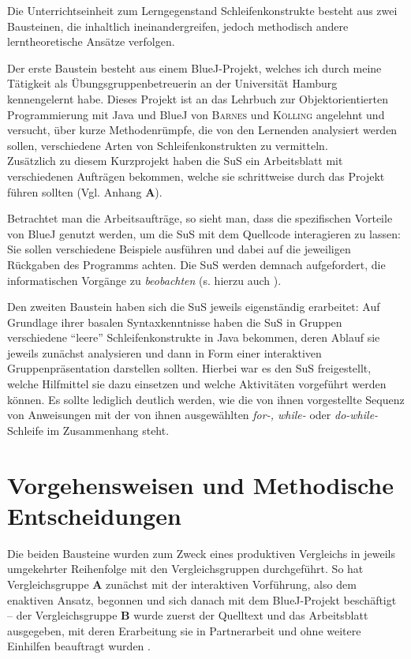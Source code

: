 \documentclass[paper=a4, DIV=13, BCOR=12mm, twoside=on, onecolumn=on, open = any, titlepage =on, parskip =half-, headsepline = on, footsepline = on, chapterprefix = on, sectionprefix = on, appendixprefix = off, fontsize = 11pt, numbers = noenddot, abstract = off]{scrreprt}
\begin{document}
Die Unterrichtseinheit zum Lerngegenstand Schleifenkonstrukte besteht aus zwei Bausteinen, die inhaltlich ineinandergreifen, jedoch methodisch andere lerntheoretische Ansätze verfolgen. 

Der erste Baustein besteht aus einem BlueJ-Projekt, welches ich durch meine Tätigkeit als Übungsgruppenbetreuerin an der Universität Hamburg kennengelernt habe. Dieses Projekt ist an das Lehrbuch zur Objektorientierten Programmierung mit Java und BlueJ von \textsc{Barnes} und \textsc{Kölling} angelehnt und versucht, über kurze Methodenrümpfe, die von den Lernenden analysiert werden sollen, verschiedene Arten von Schleifenkonstrukten zu vermitteln.\\
Zusätzlich zu diesem Kurzprojekt haben die SuS ein Arbeitsblatt mit verschiedenen Aufträgen bekommen, welche sie schrittweise durch das Projekt führen sollten (Vgl. Anhang \textbf{A}).

Betrachtet man die Arbeitsaufträge, so sieht man, dass die spezifischen Vorteile von BlueJ genutzt werden, um die SuS mit dem Quellcode interagieren zu lassen: Sie sollen verschiedene Beispiele ausführen und dabei auf die jeweiligen Rückgaben des Programms achten. Die SuS werden demnach aufgefordert, die informatischen Vorgänge zu \emph{beobachten} (s. hierzu auch \cite[S.67ff.]{aebli:11}). 

Den zweiten Baustein haben sich die SuS jeweils eigenständig erarbeitet: Auf Grundlage ihrer basalen Syntaxkenntnisse haben die SuS in Gruppen verschiedene "`leere"' Schleifenkonstrukte in Java bekommen, deren Ablauf sie jeweils zunächst analysieren und dann in Form einer interaktiven Gruppenpräsentation darstellen sollten. Hierbei war es den SuS freigestellt, welche Hilfmittel sie dazu einsetzen und welche Aktivitäten vorgeführt werden können. Es sollte lediglich deutlich werden, wie die von ihnen vorgestellte Sequenz von Anweisungen mit der von ihnen ausgewählten \emph{for-, while-} oder \emph{do-while-}Schleife im Zusammenhang steht.

\par \singlespacing
 \section{Vorgehensweisen und Methodische Entscheidungen}
 \label{sec:vorgehensweisen}
\onehalfspacing

Die beiden Bausteine wurden zum Zweck eines produktiven Vergleichs in jeweils umgekehrter Reihenfolge mit den Vergleichsgruppen durchgeführt. So hat Vergleichsgruppe \textsc{\textbf{A}} zunächst mit der interaktiven Vorführung, also dem enaktiven Ansatz, begonnen und sich danach mit dem BlueJ-Projekt beschäftigt -- der Vergleichsgruppe \textsc{\textbf{B}} wurde zuerst der Quelltext und das Arbeitsblatt ausgegeben, mit deren Erarbeitung sie in Partnerarbeit und ohne weitere Einhilfen beauftragt wurden .
\end{document}
